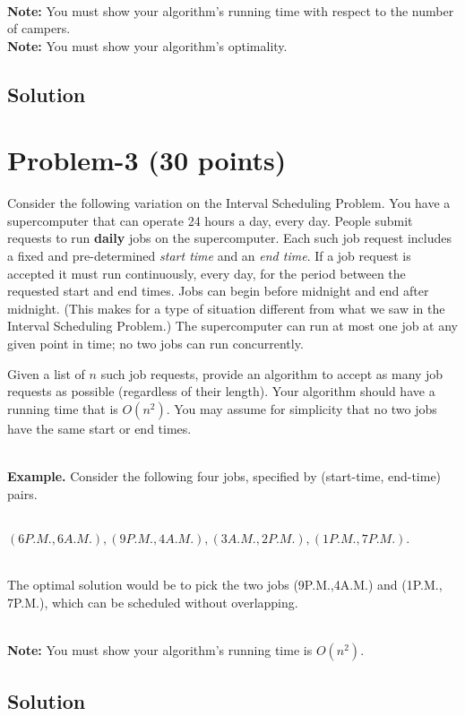 \documentclass[11pt]{article}
\begin{document}
~\\
\noindent
\textbf{Note:} You must show your algorithm's running time with respect to the number of campers. \\
\textbf{Note:} You must show your algorithm's optimality. \\


\subsection*{Solution}



\newpage
\section*{Problem-3 (30 points)}
Consider the following variation on the Interval Scheduling Problem. You have a supercomputer that can operate 24 hours a day, every day. People submit requests to run {\bf daily} jobs on the supercomputer. Each such job request includes a fixed and pre-determined {\it start time} and an {\it end time}. If a job request is accepted it must run continuously, every day, for the period between the requested start and end times. Jobs can begin before midnight and end after midnight. (This makes for a type of situation different from what we saw in the Interval Scheduling Problem.) The supercomputer can run at most one job at any given point in time; no two jobs can run concurrently.

Given a list of $n$ such job requests, provide an algorithm to accept as many job requests as possible (regardless of their length). Your algorithm should have a running time that is $O(n^2)$. You may assume for simplicity that no two jobs have the same start or end times.

~\\
\noindent
{\bf Example.} Consider the following four jobs, specified by (start-time, end-time) pairs.

~\\
\indent
$(6P.M., 6A.M.), (9P.M., 4A.M.), (3A.M., 2P.M.), (1P.M., 7P.M.).$

~\\
\noindent
The optimal solution would be to pick the two jobs (9P.M.,4A.M.) and (1P.M., 7P.M.), which can be scheduled without overlapping.

~\\
\noindent
\textbf{Note:} You must show your algorithm's running time is $O(n^2)$. \\
 
 

\subsection*{Solution}
\end{document}

